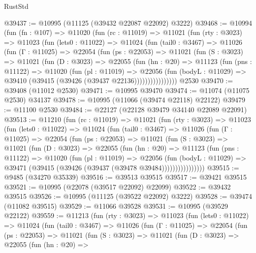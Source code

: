 \begin{lexlean}{RustStd}
\begin{coremodule}
@39437 := @10995 (@11125 (@39432 @22087 @22092) @3222)
@39468 := @10994
    (fun (fn : @107) =>
    @11020
      (fun (rc : @11019) =>
      @11021
        (fun (rty : @3023) =>
        @11023
          (fun (lets0 : @11022) =>
          @11024
            (fun (tail0 : @3467) =>
            @11026
              (fun (Γ : @11025) =>
              @22054
                (fun (ps : @22053) =>
                @11021
                  (fun (S : @3023) =>
                  @11021
                    (fun (D : @3023) =>
                    @22055
                      (fun (hn : @20) =>
                      @11123
                        (fun (pns : @11122) =>
                        @11020
                          (fun (pl : @11019) =>
                          @22056
                            (fun (bodyL : @11029) =>
                            @39410 (@39415 (@39426 (@39437 @22136))))))))))))))))
    @2530
@39470 := @39408 (@11012 @2530)
@39471 := @10995 @39470
@39474 := @11074 (@11075 @2530) @34137
@39478 := @10995 (@11066 (@39474 @22118) @22122)
@39479 := @11100 @2530
@39484 := @22127 (@22128 @39479 @34140 @22089 @22091)
@39513 := @11210
    (fun (rc : @11019) =>
    @11021
      (fun (rty : @3023) =>
      @11023
        (fun (lets0 : @11022) =>
        @11024
          (fun (tail0 : @3467) =>
          @11026
            (fun (Γ : @11025) =>
            @22054
              (fun (ps : @22053) =>
              @11021
                (fun (S : @3023) =>
                @11021
                  (fun (D : @3023) =>
                  @22055
                    (fun (hn : @20) =>
                    @11123
                      (fun (pns : @11122) =>
                      @11020
                        (fun (pl : @11019) =>
                        @22056
                          (fun (bodyL : @11029) =>
                          @39471 (@39415 (@39426 (@39437 (@39478 @39484))))))))))))))))
@39515 := @9485 (@34270 @35339)
@39516 := @39513 @39515
@39517 := @39421 @39515
@39521 := @10995 (@22078 (@39517 @22092) @22099)
@39522 := @39432 @39515
@39526 := @10995 (@11125 (@39522 @22092) @3222)
@39528 := @39474 (@11082 @39515)
@39529 := @11066 @39528
@39531 := @10995 (@39529 @22122)
@39559 := @11213
    (fun (rty : @3023) =>
    @11023
      (fun (lets0 : @11022) =>
      @11024
        (fun (tail0 : @3467) =>
        @11026
          (fun (Γ : @11025) =>
          @22054
            (fun (ps : @22053) =>
            @11021
              (fun (S : @3023) =>
              @11021
                (fun (D : @3023) =>
                @22055
                  (fun (hn : @20) =>

\end{coremodule}
\end{lexlean}
